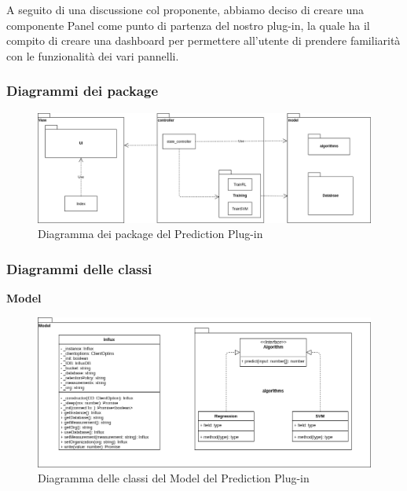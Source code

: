 A seguito di una discussione col proponente, abbiamo deciso di creare una componente Panel come punto di partenza del nostro plug-in, la quale ha il compito di creare una dashboard per permettere all’utente di prendere familiarità con le funzionalità dei vari pannelli.

\subsubsection{Diagrammi dei package}
\begin{figure}[H]
\centering
\includegraphics[scale=0.40]{../../Diagrams/Package_diagrams/plugin_design_pattern.png}
\caption{Diagramma dei package del Prediction Plug-in}
\end{figure}

\subsubsection{Diagrammi delle classi}
\textbf{Model}
\begin{figure}[H]
\centering
\includegraphics[scale=0.5]{../../Diagrams/Classes_diagrams/plugin_model.png}
\caption{Diagramma delle classi del Model del Prediction Plug-in}
\end{figure}

